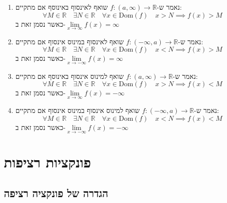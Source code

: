 \documentclass{tstextbook}
\begin{document}
\begin{definition}
  \begin{enumerate}
    \item נאמר ש-\(f:\left( a,\infty \right)\to \mathbb{R}\) שואף לאינסוף באינוסף אם מתקיים: 
$$\forall M  \in \mathbb{R}\quad \exists N \in \mathbb{R}\quad  \forall x \in \mathrm{Dom}(f)\quad  x > N\implies f(x)>M$$
כאשר נסמן זאת ב-\(\underset{ x \to \infty }{\lim }f(x)=\infty\)


    \item נאמר ש-\(f:\left(-\infty,a \right)\to \mathbb{R}\) שואף לאינסוף במינוס אינסוף אם מתקיים: 
$$\forall M  \in \mathbb{R}\quad \exists N \in \mathbb{R}\quad  \forall x \in \mathrm{Dom}(f)\quad  x < N\implies f(x)>M$$
כאשר נסמן זאת ב-\(\underset{ x \to -\infty }{\lim }f(x)=\infty\)


    \item נאמר ש-\(f:\left( a,\infty \right)\to \mathbb{R}\) שואף למינוס אינסוף באינוסף אם מתקיים: 
$$\forall M  \in \mathbb{R}\quad \exists N \in \mathbb{R}\quad  \forall x \in \mathrm{Dom}(f)\quad  x > N\implies f(x)<M$$
כאשר נסמן זאת ב-\(\underset{ x \to \infty }{\lim }f(x)=-\infty\)


    \item נאמר ש-\(f:\left(-\infty,a \right)\to \mathbb{R}\) שואף למינוס אינסוף במינוס אינסוף אם מתקיים: 
$$\forall M  \in \mathbb{R}\quad \exists N \in \mathbb{R}\quad  \forall x \in \mathrm{Dom}(f)\quad  x < N\implies f(x)<M$$
כאשר נסמן זאת ב-\(\underset{ x \to -\infty }{\lim }f(x)=-\infty\)


  \end{enumerate}
\end{definition}
\section{פונקציות רציפות}

\subsection{הגדרה של פונקציה רציפה}
\end{document}
